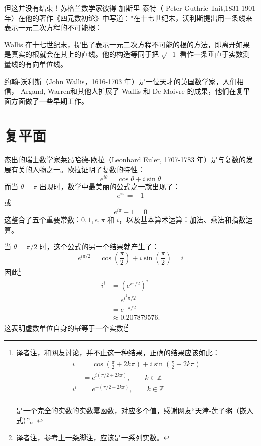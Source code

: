但这并没有结束！苏格兰数学家彼得-加斯里-泰特（ Peter Guthrie Tait,1831-1901 年）在他的著作《四元数初论》中写道："在十七世纪末，沃利斯提出用一条线来表示一元二次方程的不可能根：

\begin{CJK}{UTF8}{gkai}
    Wallis 在十七世纪末，提出了表示一元二次方程不可能的根的方法，即离开如果是真实的根就会在其上的直线。他的构造等同于把 $\sqrt{-1}$ 看作一条垂直于实数测量线的有向单位线。\cite{bib4-3}
\end{CJK}

约翰-沃利斯（John Wallis，1616-1703 年）是一位天才的英国数学家\cite{bib4-4}，人们相信， Argand, Warren和其他人扩展了 Wallis 和 De Moivre 的成果，他们在复平面方面做了一些早期工作。

\section{复平面}
杰出的瑞士数学家莱昂哈德-欧拉（Leonhard Euler, 1707-1783 年）是与复数的发展有关的人物之一。欧拉证明了复数的特性：
$$
    e^{i \theta}=\cos \theta+i \sin \theta
$$
而当 $\theta=\pi$ 出现时，数学中最美丽的公式之一就出现了：
$$
    e^{i \pi}=-1
$$
或
$$
    e^{i \pi}+1=0
$$
这整合了五个重要常数：$0,1, e, \pi$ 和 $i$，以及基本算术运算：加法、乘法和指数运算。

当 $\theta=\pi / 2$ 时，这个公式的另一个结果就产生了：
$$
    e^{i \pi / 2}=\cos \left(\frac{\pi}{2}\right)+i \sin \left(\frac{\pi}{2}\right)=i
$$
因此\footnote{译者注，和网友讨论，并不止这一种结果，正确的结果应该如此：
    \begin{align*}
        \begin{aligned}
            i   & =  \cos (\frac{\pi}{2}+2k\pi)+i\sin(\frac{\pi}{2}+2k\pi) \\
                & =e^{i({\pi/2}+2k\pi)},\qquad k\in \mathbb{Z}             \\
            i^i & = e^{-(\pi/2+2k\pi)},\qquad k\in \mathbb{Z}              \\
        \end{aligned}
    \end{align*}

    是一个完全的实数的实数幂函数，对应多个值，感谢网友“天津-莲子粥（嵌入式）”。}
$$
    \begin{aligned}
        i^{i} & =\left(e^{i \pi / 2}\right)^{i} \\
              & =e^{i^{2} \pi / 2}              \\
              & =e^{-\pi / 2}                   \\
              & \approx 0.207879576 .
    \end{aligned}
$$
这表明虚数单位自身的幂等于一个实数!\footnote{译者注，参考上一条脚注，应该是一系列实数。}

